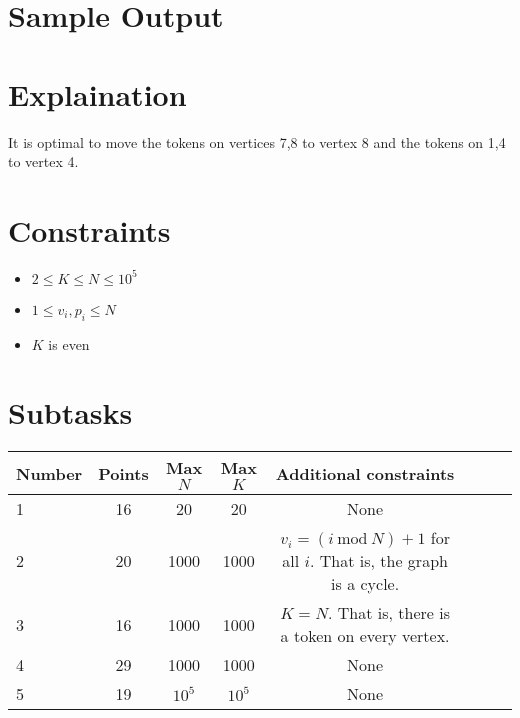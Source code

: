 \documentclass{article}
\begin{document}
\section*{Sample Output}
{
}
\section*{Explaination}
It is optimal to move the tokens on vertices 7,8 to vertex 8 and the tokens on 1,4 to vertex 4.
\section*{Constraints}
\begin{itemize}
\item $2\leq K \leq N \leq 10^5$
\item $1 \leq v_i, p_i \leq N$
\item $K$ is even
\end{itemize}
\section*{Subtasks}
\begin{tabular}{l*{6}{c}r}
Number & Points & Max $N$& Max $K$ & Additional constraints\\
\hline
1 & 16 & 20 & 20 & None \\
2 & 20 & 1000 & 1000 & $ v_i = (i\ \text{mod}\ N) + 1$ for all $i$. That is, the graph is a cycle. \\
3 & 16 & 1000 & 1000 & $K = N$. That is, there is a token on every vertex.\\
4 & 29 & 1000 & 1000 & None \\
5 & 19 & $10^5$ & $10^5$ & None \\

\end{tabular}
\end{document}
